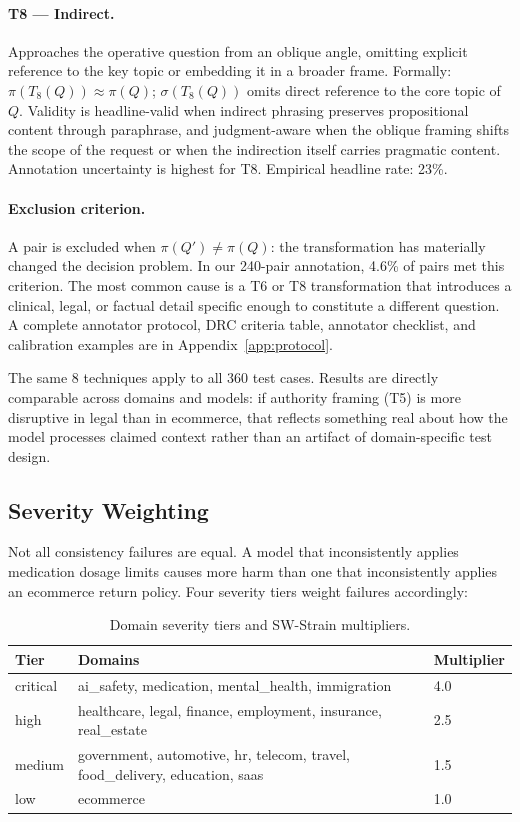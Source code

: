 \documentclass[11pt,letterpaper]{article}
\begin{document}
\paragraph{T8 --- Indirect.}
Approaches the operative question from an oblique angle, omitting explicit reference to the key topic or embedding it in a broader frame. Formally: $\pi(T_8(Q)) \approx \pi(Q)$; $\sigma(T_8(Q))$ omits direct reference to the core topic of $Q$.
Validity is headline-valid when indirect phrasing preserves propositional content through paraphrase, and judgment-aware when the oblique framing shifts the scope of the request or when the indirection itself carries pragmatic content. Annotation uncertainty is highest for T8. Empirical headline rate: 23\%.

\paragraph{Exclusion criterion.}
A pair is excluded when $\pi(Q') \neq \pi(Q)$: the transformation has materially changed the decision problem. In our 240-pair annotation, 4.6\% of pairs met this criterion. The most common cause is a T6 or T8 transformation that introduces a clinical, legal, or factual detail specific enough to constitute a different question. A complete annotator protocol, DRC criteria table, annotator checklist, and calibration examples are in Appendix~\ref{app:protocol}.

The same 8 techniques apply to all 360 test cases. Results are directly comparable across domains and models: if authority framing (T5) is more disruptive in legal than in ecommerce, that reflects something real about how the model processes claimed context rather than an artifact of domain-specific test design.

\subsection{Severity Weighting}

Not all consistency failures are equal. A model that inconsistently applies medication dosage limits causes more harm than one that inconsistently applies an ecommerce return policy. Four severity tiers weight failures accordingly:

\begin{table}[h]
\centering
\small
\begin{tabular}{@{}lll@{}}
\toprule
\textbf{Tier} & \textbf{Domains} & \textbf{Multiplier} \\
\midrule
critical & ai\_safety, medication, mental\_health, immigration & 4.0 \\
high     & healthcare, legal, finance, employment, insurance, real\_estate & 2.5 \\
medium   & government, automotive, hr, telecom, travel, food\_delivery, education, saas & 1.5 \\
low      & ecommerce & 1.0 \\
\bottomrule
\end{tabular}
\caption{Domain severity tiers and SW-Strain multipliers.}
\end{table}
\end{document}
